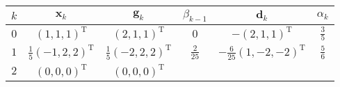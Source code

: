 \begin{example}
\begin{solution}
        \begin{table}[htbp]
            \centering
            \begin{tabular}{c|c|c|c|c|c}
                \hline
                $k$ & $\boldsymbol{x}_k$ & $\boldsymbol{g}_k$ & $\beta_{k-1}$ & $\boldsymbol{d}_k$ & $\alpha_k$\\\hline
                $0$ & $ (1,1,1)^{\mathrm{T}} $ & $(2,1,1)^{\mathrm{T}}$ & $0$ & $ -(2,1,1)^{\mathrm{T}} $ & $\frac{3}{5}$\\\hline
                $1$ & $ \frac{1}{5}(-1,2,2)^{\mathrm{T}} $ & $\frac{1}{5}(-2,2,2)^{\mathrm{T}}$ & $\frac{2}{25}$ & $ -\frac{6}{25}(1,-2,-2)^{\mathrm{T}} $ & $\frac{5}{6}$\\\hline
                $2$ & $(0,0,0)^{\mathrm{T}}$ & $(0,0,0)^{\mathrm{T}}$ & \\\hline
            \end{tabular}
        \end{table}
    \end{solution}
\end{example}
